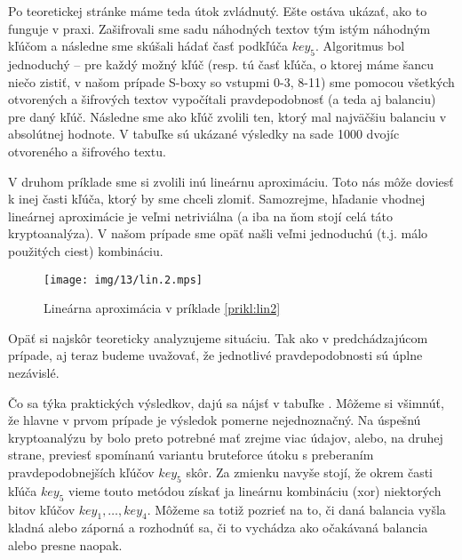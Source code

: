 \begin{priklad}
    Po teoretickej stránke máme teda útok zvládnutý. Ešte ostáva
    ukázať, ako to funguje v praxi. Zašifrovali sme sadu náhodných
    textov tým istým náhodným kľúčom a následne sme skúšali hádať časť
    podkľúča $key_5$. Algoritmus bol jednoduchý -- pre každý možný
    kľúč (resp. tú časť kľúča, o ktorej máme šancu niečo zistiť, v
    našom prípade S-boxy so vstupmi 0-3, 8-11) sme pomocou všetkých
    otvorených a šifrových textov vypočítali pravdepodobnosť (a teda
    aj balanciu) pre daný kľúč. Následne sme ako kľúč zvolili ten,
    ktorý mal najväčšiu balanciu v absolútnej hodnote. V tabuľke
     sú ukázané výsledky na sade 1000 dvojíc otvoreného a
    šifrového textu.
    
\end{priklad}

\begin{priklad}
    \label{prikl:lin2}
    V druhom príklade sme si zvolili inú lineárnu aproximáciu. Toto
    nás môže doviesť k inej časti kľúča, ktorý by sme chceli zlomiť.
    Samozrejme, hľadanie vhodnej lineárnej aproximácie je veľmi
    netriviálna (a iba na ňom stojí celá táto kryptoanalýza). V našom
    prípade sme opäť našli veľmi jednoduchú (t.j. málo použitých
    ciest) kombináciu.
    \begin{figure}[H]
        \centering
        \texttt{[image: img/13/lin.2.mps]}
        \caption{Lineárna aproximácia v príklade \ref{prikl:lin2}}
    \end{figure}
    Opäť si najskôr teoreticky analyzujeme situáciu. Tak ako v
    predchádzajúcom prípade, aj teraz budeme uvažovať, že jednotlivé
    pravdepodobnosti sú úplne nezávislé.
    

    Čo sa týka praktických výsledkov, dajú sa nájsť v tabuľke
    . Môžeme si všimnúť, že hlavne v prvom prípade je
    výsledok pomerne nejednoznačný. Na úspešnú kryptoanalýzu by bolo
    preto potrebné mať zrejme viac údajov, alebo, na druhej strane,
    previesť spomínanú variantu bruteforce útoku s preberaním
    pravdepodobnejších kľúčov $key_5$ skôr. Za zmienku navyše stojí,
    že okrem časti kľúča $key_5$ vieme touto metódou získať ja
    lineárnu kombináciu (xor) niektorých bitov kľúčov $key_1, \dots,
    key_4$. Môžeme sa totiž pozrieť na to, či daná balancia vyšla
    kladná alebo záporná a rozhodnúť sa, či to vychádza ako očakávaná
    balancia alebo presne naopak.

    
\end{priklad}


